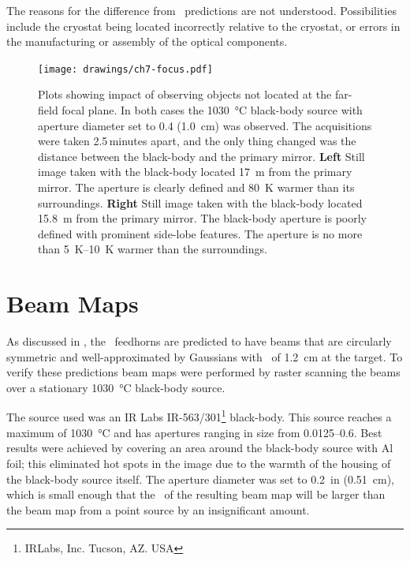 The reasons for the difference from \ZEMAX\ predictions are not understood.
Possibilities include the cryostat being located incorrectly relative to the cryostat, or errors in the manufacturing or assembly of the optical components.

\begin{figure}
\centering
\texttt{[image: drawings/ch7-focus.pdf]}
\caption[Focus distance plots]{
  Plots showing impact of observing objects not located at the far-field focal plane.
  In both cases the \SI{1030}{\celsius} black-body source with aperture diameter set to \SI{0.4}{\in} (\SI{1.0}{\cm}) was observed. The acquisitions were taken 2.5\,minutes apart, and the only thing changed was the distance between the black-body and the primary mirror.
  \textbf{Left} Still image taken with the black-body located \SI{17}{\m} from the primary mirror.
  The aperture is clearly defined and \SI{80}{\K} warmer than its surroundings.
  \textbf{Right} Still image taken with the black-body located \SI{15.8}{\m} from the primary mirror.
  The black-body aperture is poorly defined with prominent side-lobe features.
  The aperture is no more than \SIrange{5}{10}{\K} warmer than the surroundings.
}
\label{fig:ch7-focus}
\end{figure}

\section{Beam Maps} \label{sec:ch7-beam-maps}

As discussed in , the \Imager\ feedhorns are predicted to have beams that are circularly symmetric and well-approximated by Gaussians with \FWHM\ of \SI{1.2}{\cm} at the target.
To verify these predictions beam maps were performed by raster scanning the beams over a stationary \SI{1030}{\celsius} black-body source.

The source used was an IR Labs IR-563/301\footnote{IRLabs, Inc. Tucson, AZ. USA} black-body.
This source reaches a maximum of \SI{1030}{\celsius} and has apertures ranging in size from \SIrange{0.0125}{0.6}{\in}.
Best results were achieved by covering an area around the black-body source with Al foil; this eliminated hot spots in the image due to the warmth of the housing of the black-body source itself.
The aperture diameter was set to \SI{0.2}{in} (\SI{0.51}{\cm}), which is small enough that the \FWHM\ of the resulting beam map will be larger than the beam map from a point source by an insignificant amount.

